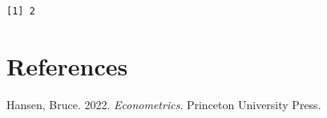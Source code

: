 \documentclass[
  letterpaper,
  DIV=11,
  numbers=noendperiod]{scrreprt}
\newlength{\cslhangindent}
\newenvironment{CSLReferences}[2] %
 {\begin{list}{}{%
  \setlength{\itemindent}{0pt}
  \setlength{\leftmargin}{0pt}
  \setlength{\parsep}{0pt}
  \ifodd #1
   \setlength{\leftmargin}{\cslhangindent}
   \setlength{\itemindent}{-1\cslhangindent}
  \fi
  \setlength{\itemsep}{#2\baselineskip}}}
 {\end{list}}
\theoremstyle{definition}
\theoremstyle{plain}
\theoremstyle{definition}
\theoremstyle{definition}
\theoremstyle{remark}
\begin{document}
\begin{verbatim}
[1] 2
\end{verbatim}


\chapter*{References}\label{references}


\label{refs}
\begin{CSLReferences}{1}{0}
Hansen, Bruce. 2022. \emph{Econometrics}. Princeton University Press.

\end{CSLReferences}
\end{document}
